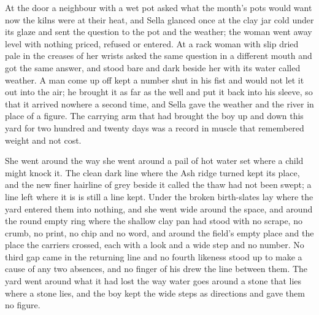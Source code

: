 At the door a neighbour with a wet pot asked what the month's pots would want now the kilns were at their heat, and Sella glanced once at the clay jar cold under its glaze and sent the question to the pot and the weather; the woman went away level with nothing priced, refused or entered. At  a rack woman with slip dried pale in the creases of her wrists asked the same question in a different mouth and got the same answer, and  stood bare and dark beside her with its water called weather. A man come up off  kept a number shut in his fist and would not let it out into the air; he brought it as far as the well and put it back into his sleeve, so that it arrived nowhere a second time, and Sella gave the weather and the river in place of a figure. The carrying arm that had brought the boy up and down this yard for two hundred and twenty days was a record in muscle that remembered weight and not cost.

She went around  the way she went around a pail of hot water set where a child might knock it. The clean dark line where the Ash ridge turned kept its place, and the new finer hairline of grey beside it called the thaw had not been swept; a line left where it is is still a line kept. Under  the broken birth-slates lay where the yard entered them into nothing, and she went wide around the space, and around the round empty ring where the shallow clay pan had stood with no scrape, no crumb, no print, no chip and no word, and around the field's empty place and the place the carriers crossed, each with a look and a wide step and no number. No third gap came in the returning line and no fourth likeness stood up to make a cause of any two absences, and no finger of his drew the line between them. The yard went around what it had lost the way water goes around a stone that lies where a stone lies, and the boy kept the wide steps as directions and gave them no figure.

\scenebreak

